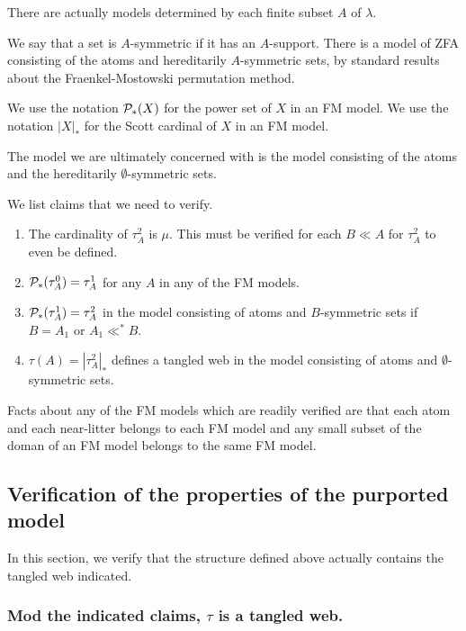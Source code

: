 \documentclass[12pt]{article}
\begin{document}
There are actually models determined by each finite subset $A$ of $\lambda$.

We say that a set is $A$-symmetric if it has an $A$-support.   There is a model of ZFA consisting of the atoms and hereditarily $A$-symmetric sets, by standard results about the
Fraenkel-Mostowski permutation method.

We use the notation ${\cal P}_*(X)$ for the power set of $X$ in an FM model.  We use the notation $|X|_*$ for the Scott cardinal of $X$ in an FM model.

The model we are ultimately concerned with is the model consisting of the atoms and the hereditarily $\emptyset$-symmetric sets.

We list claims that we need to verify.

\begin{enumerate}

\item The cardinality of $\tau^2_A$ is $\mu$.  This must be verified for each $B \ll A$ for $\tau^2_A$ to even be defined.

\item ${\cal P}_*(\tau^0_A) = \tau^1_A$  for any $A$ in any of the FM models.

\item ${\cal P}_*(\tau^1_A) = \tau^2_A$ in the model consisting of atoms and $B$-symmetric sets if $B=A_1$ or $A_1 \ll^* B$. 

\item $\tau(A) = |\tau^2_A|_*$ defines a tangled web in the model consisting of atoms and $\emptyset$-symmetric sets.

\end{enumerate}

Facts about any of the FM models which are readily verified are that each atom and each near-litter belongs to each FM model and any small subset of the doman of an FM model belongs to the same FM model.

\newpage

\subsection{Verification of the properties of the purported model}

In this section, we verify that the structure defined above actually contains the tangled web indicated.

\newpage

\subsubsection{Mod the indicated claims, $\tau$ is a tangled web.}
\end{document}
